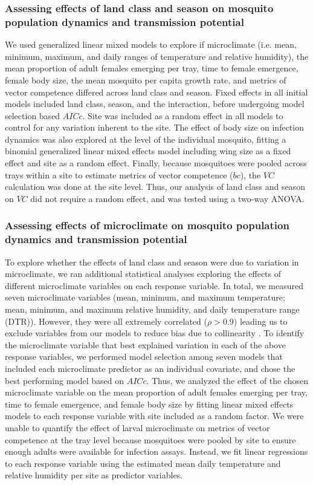 \documentclass[12pt]{article}
\begin{document}
\subsubsection{Assessing effects of land class and season on mosquito population dynamics and transmission potential}

We used generalized linear mixed models to explore if microclimate (i.e. mean, minimum, maximum, and daily ranges of temperature and relative humidity), the mean proportion of adult females emerging per tray, time to female emergence, female body size, the mean mosquito per capita growth rate, and metrics of vector competence differed across land class and season. Fixed effects in all initial models included land class, season, and the interaction, before undergoing model selection based $AICc$. Site was included as a random effect in all models to control for any variation inherent to the site. The effect of body size on infection dynamics was also explored at the level of the individual mosquito, fitting a binomial generalized linear mixed effects model including wing size as a fixed effect and site as a random effect.  Finally, because mosquitoes were pooled across trays within a site to estimate metrics of vector competence ($bc$), the $VC$ calculation was done at the site level.  Thus, our analysis of land class and season on  $VC$ did not require a random effect, and was tested using a two-way ANOVA.

\subsubsection{Assessing effects of microclimate on mosquito population dynamics and transmission potential}

To explore whether the effects of land class and season were due to variation in microclimate, we ran additional statistical analyses exploring the effects of different microclimate variables on each response variable. In total, we measured seven microclimate variables (mean, minimum, and maximum temperature; mean, minimum, and maximum relative humidity, and daily temperature range (DTR)). However, they were all extremely correlated ($\rho>0.9$) leading us to exclude variables from our models to reduce bias due to collinearity \citep{graham2003}. To identify the microclimate variable that best explained variation in each of the above response variables, we performed model selection among seven models that included each microclimate predictor as an individual covariate, and chose the best performing model based on $AICc$. Thus, we analyzed the effect of the chosen microclimate variable on the mean proportion of adult females emerging per tray, time to female emergence, and female body size by fitting linear mixed effects models to each response variable with site included as a random factor. We were unable to quantify the effect of larval microclimate on metrics of vector competence at the tray level because mosquitoes were pooled by site to ensure enough adults were available for infection assays. Instead, we fit linear regressions to each response variable using the estimated mean daily temperature and relative humidity per site as predictor variables.
\end{document}
